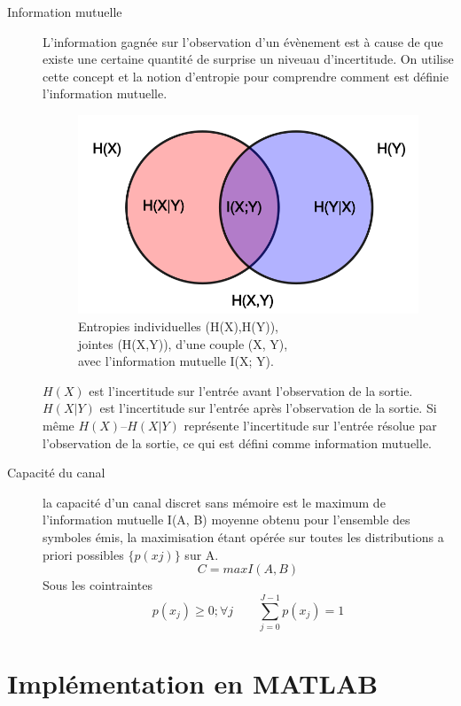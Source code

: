 \documentclass{report}
\begin{document}
\begin{description}
\item[Information mutuelle]
L'information gagnée sur l'observation d'un évènement est à cause de que existe 
une certaine quantité de surprise un niveuau d'incertitude. On utilise cette concept
et la notion d'entropie pour comprendre comment est définie l'information mutuelle.\\
\begin{figure}[h]
	\centering
	\captionsetup{justification=centering}
	\includegraphics[width=0.5\linewidth]{info}
	\caption{Entropies individuelles (H(X),H(Y)),\\ jointes (H(X,Y)), d'une couple (X, Y),\\ avec l'information mutuelle I(X; Y).}
	\label{fig:info}
\end{figure}%
$H(X)$ est l’incertitude sur l’entrée avant l’observation de la
sortie. $H(X | Y)$ est l’incertitude sur l’entrée après l’observation de
la sortie. Si même $H(X) – H(X | Y)$ représente l’incertitude sur l’entrée
résolue par l’observation de la sortie, ce qui est défini comme information mutuelle.


\item[Capacité du canal]%
la capacité d’un canal discret sans mémoire
est le maximum de l’information mutuelle I(A, B) moyenne
obtenu pour l’ensemble des symboles émis, la
maximisation étant opérée sur toutes les distributions a
priori possibles $\{p ( x j ) \}$ sur A.
\begin{equation}\label{capaciteCanal}
C = maxI(A,B)
\end{equation}
Sous les cointraintes 
\begin{equation}\label{key}
 p ( x_j ) \geq 0 ; \forall j \qquad \sum_{j=0}^{J-1}p ( x_j )=1
\end{equation}
\end{description} 



\chapter{Implémentation en MATLAB{\small \circledR}}
\end{document}
